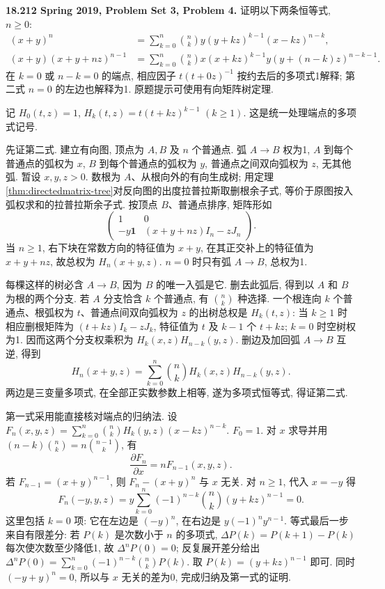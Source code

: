 \begin{exercise}\label{mit:18212-pset3-q4}
\textbf{18.212 Spring 2019, Problem Set 3, Problem 4.}
证明以下两条恒等式, $n\ge0$:
\begin{align*}
 (x+y)^n&=\sum_{k=0}^n\binom nk y(y+kz)^{k-1}(x-kz)^{n-k},\\
 (x+y)(x+y+nz)^{n-1}
   &=\sum_{k=0}^n\binom nk x(x+kz)^{k-1}
                       y(y+(n-k)z)^{n-k-1}.
\end{align*}
在 $k=0$ 或 $n-k=0$ 的端点, 相应因子 $t(t+0z)^{-1}$ 按约去后的多项式1解释; 第二式 $n=0$ 的左边也解释为1. 原题提示可使用有向矩阵树定理.
\end{exercise}
\begin{solution}
记 $H_0(t,z)=1$, $H_k(t,z)=t(t+kz)^{k-1}$ $(k\ge1)$. 这是统一处理端点的多项式记号.

先证第二式. 建立有向图, 顶点为 $A,B$ 及 $n$ 个普通点. 弧 $A\to B$ 权为1, $A$ 到每个普通点的弧权为 $x$, $B$ 到每个普通点的弧权为 $y$, 普通点之间双向弧权为 $z$, 无其他弧. 暂设 $x,y,z>0$. 数根为 $A$、从根向外的有向生成树; 用定理\ref{thm:directedmatrix-tree}对反向图的出度拉普拉斯取删根余子式, 等价于原图按入弧权求和的拉普拉斯余子式. 按顶点 $B$、普通点排序, 矩阵形如
\[
 \begin{pmatrix}1&0\\-y\mathbf1&(x+y+nz)I_n-zJ_n\end{pmatrix}.
\]
当 $n\ge1$, 右下块在常数方向的特征值为 $x+y$, 在其正交补上的特征值为 $x+y+nz$, 故总权为 $H_n(x+y,z)$. $n=0$ 时只有弧 $A\to B$, 总权为1.

每棵这样的树必含 $A\to B$, 因为 $B$ 的唯一入弧是它. 删去此弧后, 得到以 $A$ 和 $B$ 为根的两个分支. 若 $A$ 分支恰含 $k$ 个普通点, 有 $\binom nk$ 种选择. 一个根连向 $k$ 个普通点、根弧权为 $t$、普通点间双向弧权为 $z$ 的出树总权是 $H_k(t,z)$: 当 $k\ge1$ 时相应删根矩阵为 $(t+kz)I_k-zJ_k$, 特征值为 $t$ 及 $k-1$ 个 $t+kz$; $k=0$ 时空树权为1. 因而这两个分支权乘积为 $H_k(x,z)H_{n-k}(y,z)$. 删边及加回弧 $A\to B$ 互逆, 得到
\[
 H_n(x+y,z)=\sum_{k=0}^n\binom nk H_k(x,z)H_{n-k}(y,z).
\]
两边是三变量多项式, 在全部正实数参数上相等, 遂为多项式恒等式, 得证第二式.

第一式采用能直接核对端点的归纳法. 设
$F_n(x,y,z)=\sum_{k=0}^n\binom nk H_k(y,z)(x-kz)^{n-k}$. $F_0=1$. 对 $x$ 求导并用 $(n-k)\binom nk=n\binom{n-1}k$, 有
\[
 \frac{\partial F_n}{\partial x}=nF_{n-1}(x,y,z).
\]
若 $F_{n-1}=(x+y)^{n-1}$, 则 $F_n-(x+y)^n$ 与 $x$ 无关. 对 $n\ge1$, 代入 $x=-y$ 得
\[
 F_n(-y,y,z)=y\sum_{k=0}^n(-1)^{n-k}\binom nk(y+kz)^{n-1}=0.
\]
这里包括 $k=0$ 项: 它在左边是 $(-y)^n$, 在右边是 $y(-1)^n y^{n-1}$. 等式最后一步来自有限差分: 若 $P(k)$ 是次数小于 $n$ 的多项式, $\Delta P(k)=P(k+1)-P(k)$ 每次使次数至少降低1, 故 $\Delta^nP(0)=0$; 反复展开差分给出 $\Delta^nP(0)=\sum_{k=0}^n(-1)^{n-k}\binom nkP(k)$. 取 $P(k)=(y+kz)^{n-1}$ 即可. 同时 $(-y+y)^n=0$, 所以与 $x$ 无关的差为0, 完成归纳及第一式的证明.
\end{solution}

